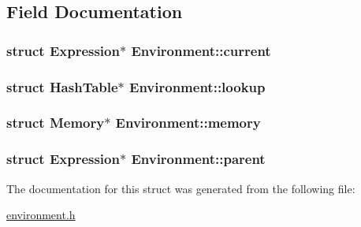 \subsection{Field Documentation}
\hypertarget{structEnvironment_a34909dda403dd6cec46f0f677fd33622}{
\subsubsection[{current}]{\setlength{\rightskip}{0pt plus 5cm}struct Expression$\ast$ Environment\+::current}}\label{structEnvironment_a34909dda403dd6cec46f0f677fd33622}
\hypertarget{structEnvironment_a07eb64196282faa20d47b862cb399cb5}{
\subsubsection[{lookup}]{\setlength{\rightskip}{0pt plus 5cm}struct {\bf Hash\+Table}$\ast$ Environment\+::lookup}}\label{structEnvironment_a07eb64196282faa20d47b862cb399cb5}
\hypertarget{structEnvironment_ac70275bcb0fb6e57a0f12487fff2211b}{
\subsubsection[{memory}]{\setlength{\rightskip}{0pt plus 5cm}struct {\bf Memory}$\ast$ Environment\+::memory}}\label{structEnvironment_ac70275bcb0fb6e57a0f12487fff2211b}
\hypertarget{structEnvironment_a95bad62545979a85c3f7c22d18d6cb6d}{
\subsubsection[{parent}]{\setlength{\rightskip}{0pt plus 5cm}struct Expression$\ast$ Environment\+::parent}}\label{structEnvironment_a95bad62545979a85c3f7c22d18d6cb6d}


The documentation for this struct was generated from the following file\+:\begin{DoxyCompactItemize}
\item 
\hyperlink{environment_8h}{environment.\+h}\end{DoxyCompactItemize}
